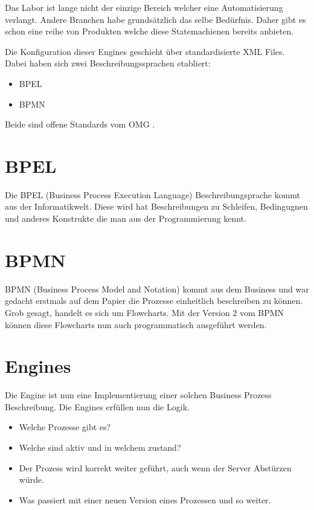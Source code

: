 \documentclass[paper=a4,twoside=false,BCOR=0mm,DIV=calc,fontsize=12pt]{scrartcl}
\begin{document}
Das Labor ist lange nicht der einzige Bereich welcher eine Automatisierung verlangt. Andere Branchen habe grundsätzlich das selbe
Bedürfnis. Daher gibt es schon eine reihe von Produkten welche diese Statemachienen bereits anbieten.

Die Konfiguration dieser Engines geschieht über standardisierte XML Files. Dabei haben sich zwei Beschreibungssprachen etabliert:
\begin{itemize}
 \item BPEL
 \item BPMN
\end{itemize}

Beide sind offene Standards vom OMG \cite{omg}.



\section{BPEL}
Die BPEL (Business Process Execution Language) Beschreibungsprache kommt aus der Informatikwelt. Diese wird hat Beschreibungen zu
Schleifen, Bedingugnen und anderes Konstrukte die man aus der Programmierung kennt. 


\section{BPMN}
BPMN (Business Process Model and Notation) kommt aus dem Business und war gedacht erstmals auf dem Papier die Prozesse einheitlich
beschreiben zu können. Grob gesagt, handelt es sich um Flowcharts. 
Mit der Version 2 vom BPMN können diese Flowcharts nun auch programmatisch ausgeführt werden. 




\section{Engines}
Die Engine ist nun eine Implementierung einer solchen Business Prozess Beschreibung. Die Engines erfüllen nun die Logik. 
\begin{itemize}
  \item Welche Prozesse gibt es?
  \item Welche sind aktiv und in welchem zustand?
  \item Der Prozess wird korrekt weiter geführt, auch wenn der Server Abstürzen würde.
  \item Was passiert mit einer neuen Version eines Prozessen und so weiter.                      
\end{itemize}
\end{document}
